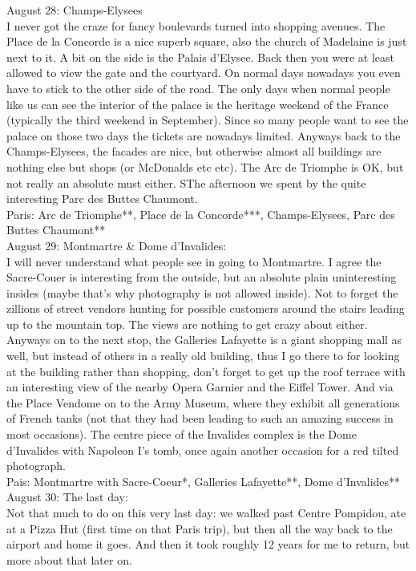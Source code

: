 August 28: Champs-Elysees\\
I never got the craze for fancy boulevards turned into shopping avenues. The Place de la Concorde is a nice superb square, also the church of Madelaine is just next to it. A bit on the side is the Palais d'Elysee. Back then you were at least allowed to view the gate and the courtyard. On normal days nowadays you even have to stick to the other side of the road. The only days when normal people like us can see the interior of the palace is the heritage weekend of the France (typically the third weekend in September). Since so many people want to see the palace on those two days the tickets are nowadays limited. Anyways back to the Champs-Elysees, the facades are nice, but otherwise almost all buildings are nothing else but shops (or McDonalds etc etc). The Arc de Triomphe is OK, but not really an absolute must either. SThe afternoon we spent by the quite interesting Parc des Buttes Chaumont.\\

Paris: Arc de Triomphe**, Place de la Concorde***, Champs-Elysees, Parc des Buttes Chaumont**\\

August 29: Montmartre \& Dome d'Invalides:\\
I will never understand what people see in going to Montmartre. I agree the Sacre-Couer is interesting from the outside, but an absolute plain uninteresting insides (maybe that's why photography is not allowed inside). Not to forget the zillions of street vendors hunting for possible customers around the stairs leading up to the mountain top. The views are nothing to get crazy about either. Anyways on to the next stop, the Galleries Lafayette is a giant shopping mall as well, but instead of others in a really old building, thus I go there to for looking at the building rather than shopping, don't forget to get up the roof terrace with an interesting view of the nearby Opera Garnier and the Eiffel Tower. And via the Place Vendome on to the Army Museum, where they exhibit all generations of French tanks (not that they had been leading to such an amazing success in most occasions). The centre piece of the Invalides complex is the Dome d'Invalides with Napoleon I's tomb, once again another occasion for a red tilted photograph.\\

Pais: Montmartre with Sacre-Coeur*, Galleries Lafayette**, Dome d'Invalides**\\

August 30: The last day:\\ %
Not that much to do on this very last day: we walked past Centre Pompidou, ate at a Pizza Hut (first time on that Paris trip), but then all the way back to the airport and home it goes. And then it took roughly 12 years for me to return, but more about that later on.

